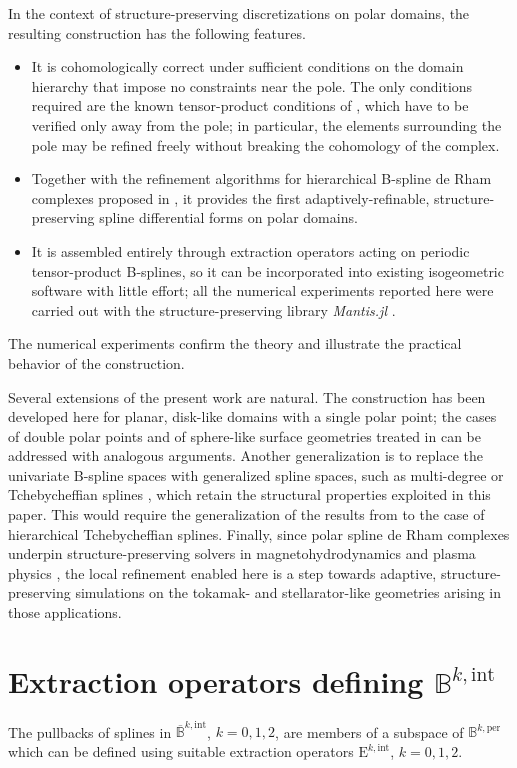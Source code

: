 \documentclass[10pt]{article}
\newcommand{\mbf}[1]{{\boldsymbol{#1}}}
\newcommand{\vSpace}[1]{\mathbb{#1}}
\newcommand{\mat}[1]{\mbf{\mathrm{#1}}}
\newcommand{\cU}{\theta}
\newcommand{\cV}{\rho}
\newcommand{\kntU}{\cU}
\newcommand{\kntV}{\cV}
\newcommand{\kntsU}{\mbf{\kntU}}
\newcommand{\kntsV}{\mbf{\kntV}}
\newcommand{\pkntsU}{\kntsU^\per}
\newcommand{\bsp}{B}
\newcommand{\bspS}{\vSpace{\bsp}}
\newcommand{\tpF}[2]{\bspS^{#1}}
\newcommand{\per}{\mathrm{per}}
\newcommand{\tint}{\mathrm{int}}
\theoremstyle{plain}
\theoremstyle{definition}
\theoremstyle{remark}
\begin{document}
In the context of structure-preserving discretizations on polar domains, the resulting construction has the following features.
\begin{itemize}
    \item It is cohomologically correct under sufficient conditions on the domain hierarchy that impose no constraints near the pole.
    The only conditions required are the known tensor-product conditions of \cite{Shepherd:2024}, which have to be verified only away from the pole; in particular, the elements surrounding the pole may be refined freely without breaking the cohomology of the complex.
    \item Together with the refinement algorithms for hierarchical B-spline de Rham complexes proposed in \cite{Cabanas:2025,Dijkstra:2026}, it provides the first adaptively-refinable, structure-preserving spline differential forms on polar domains.
    \item It is assembled entirely through extraction operators acting on periodic tensor-product B-splines, so it can be incorporated into existing isogeometric software with little effort; all the numerical experiments reported here were carried out with the structure-preserving library \emph{Mantis.jl} \cite{Cabanas:2026}.
\end{itemize}
The numerical experiments confirm the theory and illustrate the practical behavior of the construction.

Several extensions of the present work are natural.
The construction has been developed here for planar, disk-like domains with a single polar point; the cases of double polar points and of sphere-like surface geometries treated in \cite{Toshniwal:2021} can be addressed with analogous arguments.
Another generalization is to replace the univariate B-spline spaces with generalized spline spaces, such as multi-degree \cite{Toshniwal:2020} or Tchebycheffian splines \cite{Hiemstra:2020}, which retain the structural properties exploited in this paper.
This would require the generalization of the results from \cite{Shepherd:2024} to the case of hierarchical Tchebycheffian splines.
Finally, since polar spline de Rham complexes underpin structure-preserving solvers in magnetohydrodynamics and plasma physics \cite{Holderied:2022b,Possanner:2023}, the local refinement enabled here is a step towards adaptive, structure-preserving simulations on the tokamak- and stellarator-like geometries arising in those applications.


\appendix
{}
\section{Extraction operators defining $\bspS^{k,\tint}$}\label{app:intermediate-extraction}
The pullbacks of splines in $\overline{\bspS}^{k,\tint}$, $k = 0, 1, 2$, are members of a subspace of $\tpF{k,\per}{\pkntsU,\kntsV}$ which can be defined using suitable extraction operators $\mat{E}^{k,\tint}$, $k = 0, 1, 2$.
\end{document}
